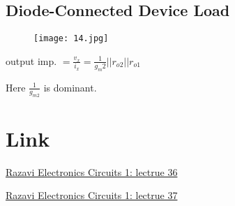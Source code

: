\documentclass[fontset=windows]{article}
\begin{document}
\subsection*{Diode-Connected Device Load}

\begin{figure}[htbp]
    \centering
    \texttt{[image: 14.jpg]}
    \captionsetup{labelformat=empty}
    \caption{}
    \label{14}
\end{figure}

output imp. $=\frac{v_x}{i_x}=\frac{1}{g_m2}||r_{o2}||r_{o1}$

Here $\frac{1}{g_{m2}}$ is dominant. 

\section*{Link}

\href{https://www.bilibili.com/video/BV1FD4y1R7Ah?p=36&vd_source=1d0c07486a3bd3b0adb8ac548bf6453e}{Razavi Electronics Circuits 1: lectrue 36}

\href{https://www.bilibili.com/video/BV1FD4y1R7Ah?p=37&vd_source=1d0c07486a3bd3b0adb8ac548bf6453e}{Razavi Electronics Circuits 1: lectrue 37}
\end{document}
